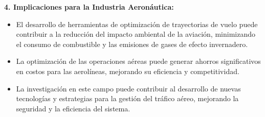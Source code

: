 \documentclass[fleqn]{article}
\begin{document}
\textbf{4. Implicaciones para la Industria Aeronáutica:}

\begin{itemize}
    \item El desarrollo de herramientas de optimización de trayectorias de vuelo puede contribuir a la reducción del impacto ambiental de la aviación, minimizando el consumo de combustible y las emisiones de gases de efecto invernadero.
    \item La optimización de las operaciones aéreas puede generar ahorros significativos en costos para las aerolíneas, mejorando su eficiencia y competitividad.
    \item La investigación en este campo puede contribuir al desarrollo de nuevas tecnologías y estrategias para la gestión del tráfico aéreo, mejorando la seguridad y la eficiencia del sistema.
\end{itemize}
\end{document}
